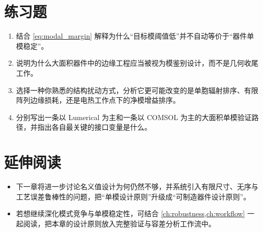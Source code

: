 \section*{练习题}
\begin{enumerate}
  \item \basicq 结合 \cref{eq:modal_margin} 解释为什么“目标模阈值低”并不自动等价于“器件单模稳定”。

  \item \basicq 说明为什么大面积器件中的边缘工程应当被视为模鉴别设计，而不是几何收尾工作。

  \item \midq 选择一种你熟悉的结构扰动方式，分析它更可能改变的是单胞辐射排序、有限阵列边缘损耗，还是电热工作点下的净模增益排序。

  \item \hardq 分别写出一条以 Lumerical 为主和一条以 COMSOL 为主的大面积单模验证路径，并指出各自最关键的接口变量是什么。
\end{enumerate}

\section*{延伸阅读}
\begin{itemize}
  \item 下一章将进一步讨论名义值设计为何仍然不够，并系统引入有限尺寸、无序与工艺误差鲁棒性的问题，把“单模设计原则”升级成“可制造器件设计原则”。

  \item 若想继续深化模式竞争与单模稳定性，可结合 \cref{ch:robustness,ch:workflow} 一起阅读，把本章的设计原则放入完整验证与容差分析工作流中。
\end{itemize}
